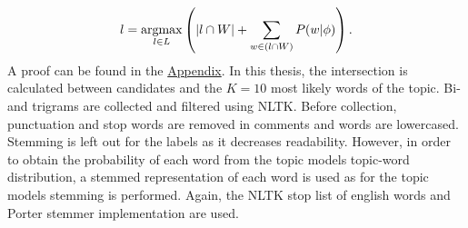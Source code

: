 \begin{equation}
l = \operatorname*{argmax}_{l \in L} \left( |l \cap W| + \sum_{w \in (l \cap W)} P(w|\phi) \right) \text{.}
\end{equation}
A proof can be found in the \hyperref[labelproof]{Appendix}.
In this thesis, the intersection is calculated between candidates and the $K=10$ most likely words of the topic.
Bi- and trigrams are collected and filtered using NLTK. Before collection, punctuation and stop words are removed in comments and words are lowercased. Stemming is left out for the labels as it decreases readability. However, in order to obtain the probability of each word from the topic models topic-word distribution, a stemmed representation of each word is used as for the topic models stemming is performed. Again, the NLTK stop list of english words and Porter stemmer \cite{Porter:1997:ASS:275537.275705} implementation are used.
\clearpage